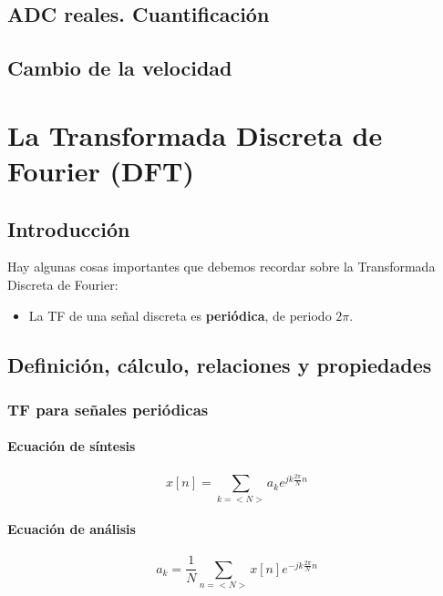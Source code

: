 \documentclass[a4paper]{book}
\begin{document}
\section{ADC reales. Cuantificación}

\section{Cambio de la velocidad}

\chapter{La Transformada Discreta de Fourier (DFT)}

\section{Introducción}

Hay algunas cosas importantes que debemos recordar sobre la Transformada Discreta de Fourier:

\begin{itemize}
	\item La TF de una señal discreta es \textbf{periódica}, de periodo $2\pi$.
\end{itemize}

\section{Definición, cálculo, relaciones y propiedades}

\subsection{TF para señales periódicas}

\begin{multicols}{2}
	\subsubsection{Ecuación de síntesis}
	
	\[ x[n] = \sum_{k=<N>}^{}a_ke^{jk \frac{2\pi}{N} n}\]
	
	\subsubsection{Ecuación de análisis}
	
	\[ a_k = \frac{1}{N}\sum_{n=<N>}x[n]e^{-jk \frac{2\pi}{N}n} \]
	
\end{multicols}
\end{document}
